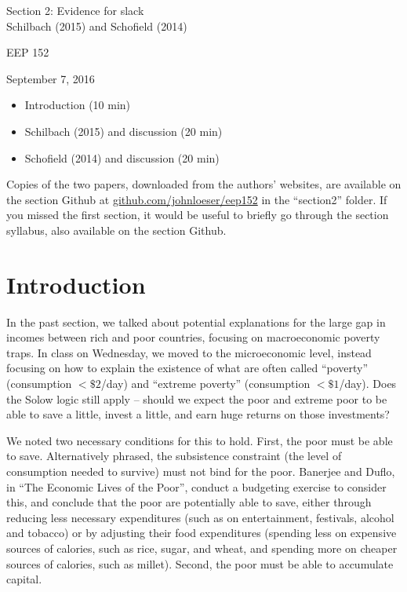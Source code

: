 \documentclass[12pt,english]{article}
\begin{document}
\begin{center}
{\Large{}Section 2: Evidence for slack} \\
{\large{}Schilbach (2015) and Schofield (2014)}
\par\end{center}{\Large \par}

\begin{center}
EEP 152
\par\end{center}

\begin{center}
September 7, 2016
\par\end{center}

\begin{itemize}
	\setlength\itemsep{-0.5em}
	\item Introduction (10 min)
	\item Schilbach (2015) and discussion (20 min)
	\item Schofield (2014) and discussion (20 min)
\end{itemize}
Copies of the two papers, downloaded from the authors' websites, are available on the section Github at \href{github.com/johnloeser/eep152}{github.com/johnloeser/eep152} in the ``section2'' folder. If you missed the first section, it would be useful to briefly go through the section syllabus, also available on the section Github.

\section{Introduction}

In the past section, we talked about potential explanations for the large gap in incomes between rich and poor countries, focusing on macroeconomic poverty traps. In class on Wednesday, we moved to the microeconomic level, instead focusing on how to explain the existence of what are often called ``poverty'' (consumption $<\$2$/day) and ``extreme poverty'' (consumption $<\$1$/day). Does the Solow logic still apply -- should we expect the poor and extreme poor to be able to save a little, invest a little, and earn huge returns on those investments?

We noted two necessary conditions for this to hold. First, the poor must be able to save. Alternatively phrased, the subsistence constraint (the level of consumption needed to survive) must not bind for the poor. Banerjee and Duflo, in ``The Economic Lives of the Poor'', conduct a budgeting exercise to consider this, and conclude that the poor are potentially able to save, either through reducing less necessary expenditures (such as on entertainment, festivals, alcohol and tobacco) or by adjusting their food expenditures (spending less on expensive sources of calories, such as rice, sugar, and wheat, and spending more on cheaper sources of calories, such as millet). Second, the poor must be able to accumulate capital.
\end{document}
